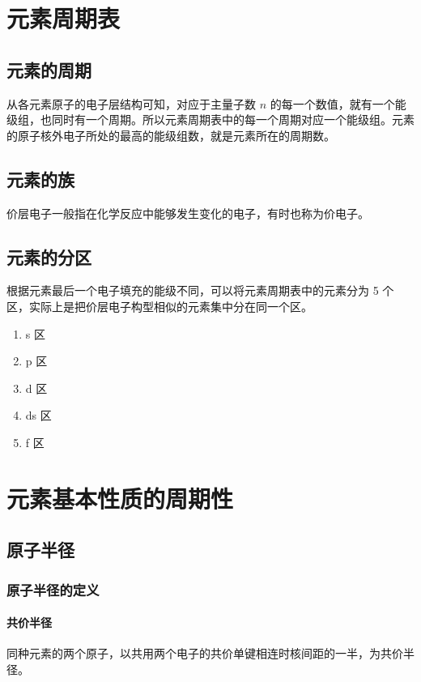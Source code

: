\section{元素周期表}

\subsection{元素的周期}
从各元素原子的电子层结构可知，对应于主量子数 $n$ 的每一个数值，就有一个能级组，也同时有一个周期。所以元素周期表中的每一个周期对应一个能级组。元素的原子核外电子所处的最高的能级组数，就是元素所在的周期数。

\subsection{元素的族}
价层电子一般指在化学反应中能够发生变化的电子，有时也称为价电子。

\subsection{元素的分区}
根据元素最后一个电子填充的能级不同，可以将元素周期表中的元素分为 5 个区，实际上是把价层电子构型相似的元素集中分在同一个区。
\begin{enumerate}
    \item s 区
    \item p 区
    \item d 区
    \item ds 区
    \item f 区
\end{enumerate}

\section{元素基本性质的周期性}

\subsection{原子半径}

\subsubsection{原子半径的定义}

\paragraph{共价半径}
同种元素的两个原子，以共用两个电子的共价单键相连时核间距的一半，为共价半径。

